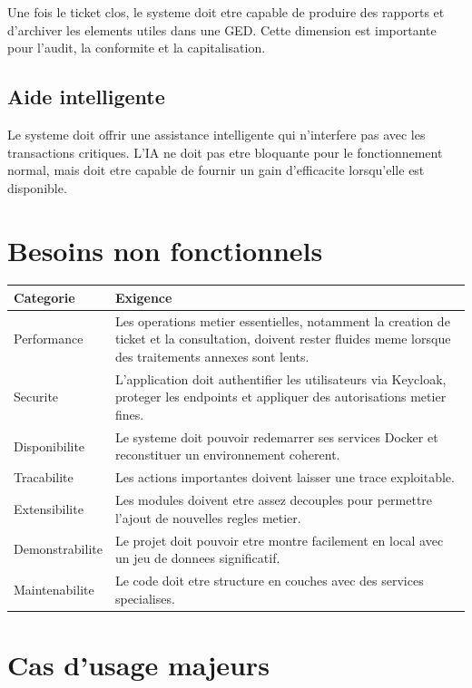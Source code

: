 Une fois le ticket clos, le systeme doit etre capable de produire des rapports et d'archiver les elements utiles dans une GED. Cette dimension est importante pour l'audit, la conformite et la capitalisation.

\subsection{Aide intelligente}

Le systeme doit offrir une assistance intelligente qui n'interfere pas avec les transactions critiques. L'IA ne doit pas etre bloquante pour le fonctionnement normal, mais doit etre capable de fournir un gain d'efficacite lorsqu'elle est disponible.

\section{Besoins non fonctionnels}

\begin{longtable}{>{\raggedright\arraybackslash}p{3cm} >{\raggedright\arraybackslash}p{10.5cm}}
\toprule
Categorie & Exigence \\
\midrule
Performance & Les operations metier essentielles, notamment la creation de ticket et la consultation, doivent rester fluides meme lorsque des traitements annexes sont lents. \\
Securite & L'application doit authentifier les utilisateurs via Keycloak, proteger les endpoints et appliquer des autorisations metier fines. \\
Disponibilite & Le systeme doit pouvoir redemarrer ses services Docker et reconstituer un environnement coherent. \\
Tracabilite & Les actions importantes doivent laisser une trace exploitable. \\
Extensibilite & Les modules doivent etre assez decouples pour permettre l'ajout de nouvelles regles metier. \\
Demonstrabilite & Le projet doit pouvoir etre montre facilement en local avec un jeu de donnees significatif. \\
Maintenabilite & Le code doit etre structure en couches avec des services specialises. \\
\bottomrule
\end{longtable}

\section{Cas d'usage majeurs}

